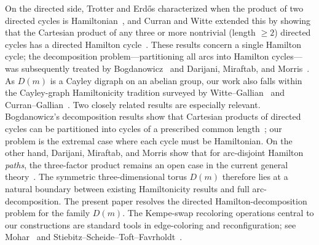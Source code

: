 \documentclass[11pt]{article}
\begin{document}
On the directed side, Trotter and Erd\H{o}s characterized when the product of two directed cycles is Hamiltonian~\cite{TrotterErdos1978}, and Curran and Witte extended this by showing that the Cartesian product of any three or more nontrivial (length $\ge 2$) directed cycles has a directed Hamilton cycle~\cite{CurranWitte1985}.
These results concern a single Hamilton cycle; the decomposition problem---partitioning all arcs into Hamilton cycles---was subsequently treated by Bogdanowicz~\cite{Bogdanowicz2017,Bogdanowicz2020} and Darijani, Miraftab, and Morris~\cite{DarijaniMiraftabMorris2022}.
As $D(m)$ is a Cayley digraph on an abelian group, our work also falls within the Cayley-graph Hamiltonicity tradition surveyed by Witte--Gallian~\cite{WitteGallian1984} and Curran--Gallian~\cite{CurranGallian1996}.
Two closely related results are especially relevant.
Bogdanowicz's decomposition results show that Cartesian products of directed cycles can be partitioned into cycles of a prescribed common length~\cite{Bogdanowicz2017}; our problem is the extremal case where each cycle must be Hamiltonian.
On the other hand, Darijani, Miraftab, and Morris show that for arc-disjoint Hamilton \emph{paths}, the three-factor product remains an open case in the current general theory~\cite{DarijaniMiraftabMorris2022}.
The symmetric three-dimensional torus $D(m)$ therefore lies at a natural boundary between existing Hamiltonicity results and full arc-decomposition.
The present paper resolves the directed Hamilton-decomposition problem for the family $D(m)$.
The Kempe-swap recoloring operations central to our constructions are standard tools in edge-coloring and reconfiguration; see Mohar~\cite{Mohar2006} and Stiebitz--Scheide--Toft--Favrholdt~\cite{StiebitzEtAl2012}.
\end{document}
